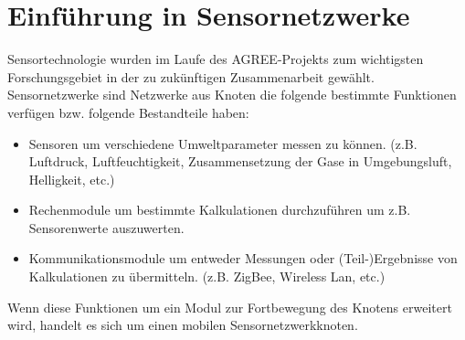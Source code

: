 \section{Einführung in Sensornetzwerke}
Sensortechnologie wurden im Laufe des AGREE-Projekts zum wichtigsten Forschungsgebiet in der zu zukünftigen Zusammenarbeit gewählt.\cite{misc:Mikkola2013} Sensornetzwerke sind Netzwerke aus Knoten die folgende bestimmte Funktionen verfügen bzw. folgende Bestandteile haben:
\begin{itemize}
	\item Sensoren um verschiedene Umweltparameter messen zu können. (z.B. Luftdruck, Luftfeuchtigkeit, Zusammensetzung der Gase in Umgebungsluft, Helligkeit, etc.)
	\item Rechenmodule um bestimmte Kalkulationen durchzuführen um z.B. Sensorenwerte auszuwerten.
	\item Kommunikationsmodule um entweder Messungen oder (Teil-)Ergebnisse von Kalkulationen zu übermitteln. (z.B. ZigBee, Wireless Lan, etc.)
\end{itemize}
Wenn diese Funktionen um ein Modul zur Fortbewegung des Knotens erweitert wird, handelt es sich um einen mobilen Sensornetzwerkknoten.\cite{jour:Howard2002}